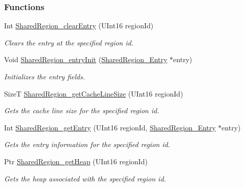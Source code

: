 \subsubsection*{Functions}
\begin{DoxyCompactItemize}
\item 
Int \hyperlink{_shared_region_8h_ae8654bccc1c7acbe7814ecc05ddee6e0}{SharedRegion\_\-clearEntry} (UInt16 regionId)
\begin{DoxyCompactList}\small\item\em Clears the entry at the specified region id. \item\end{DoxyCompactList}\item 
Void \hyperlink{_shared_region_8h_a8462f38d89bbf6d9f0974c2465606110}{SharedRegion\_\-entryInit} (\hyperlink{struct_shared_region___entry}{SharedRegion\_\-Entry} $\ast$entry)
\begin{DoxyCompactList}\small\item\em Initializes the entry fields. \item\end{DoxyCompactList}\item 
SizeT \hyperlink{_shared_region_8h_ae673e2d9bfd20a7eb07bcaab9a3c70aa}{SharedRegion\_\-getCacheLineSize} (UInt16 regionId)
\begin{DoxyCompactList}\small\item\em Gets the cache line size for the specified region id. \item\end{DoxyCompactList}\item 
Int \hyperlink{_shared_region_8h_aa7838cd5e41f00af54e2a76c3f251eca}{SharedRegion\_\-getEntry} (UInt16 regionId, \hyperlink{struct_shared_region___entry}{SharedRegion\_\-Entry} $\ast$entry)
\begin{DoxyCompactList}\small\item\em Gets the entry information for the specified region id. \item\end{DoxyCompactList}\item 
Ptr \hyperlink{_shared_region_8h_a6cbed730e029bb68e4c163b34ed69fa3}{SharedRegion\_\-getHeap} (UInt16 regionId)
\begin{DoxyCompactList}\small\item\em Gets the heap associated with the specified region id. \item\end{DoxyCompactList}\item 

\end{DoxyCompactItemize}
